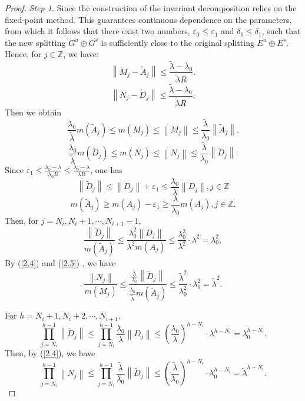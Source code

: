 \documentclass[12pt]{article}
\begin{document}
\begin{proof}{\em Step 1.}
	Since the construction of the invariant decomposition relies on the fixed‑point method. This guarantees continuous dependence on the parameters, from which it follows that there exist two numbers, $\varepsilon_0 \leqslant \varepsilon_1$ and $\delta _0 \leqslant \delta_1$, such that the new splitting $G^u \oplus G^s$ is sufficiently close to the original splitting $E^u \oplus E^s$. Hence, for $j \in \mathbb{Z}$, we have:
	$$
	\left\|M_{j}-\widetilde{A}_{j}\right\|\leqslant \frac{\widetilde{\lambda}-\lambda_{0}}{\widetilde{\lambda}R}.
	$$ 
	$$
	\left\|N_{j}-\widetilde{D}_{j}\right\|\leqslant \frac{\widetilde{\lambda}-\lambda_{0}}{\widetilde{\lambda}R}.
	$$ 
	Then we obtain
	\begin{equation}\label{2.4}\frac{\lambda_{0}}{\widetilde{\lambda}}m(\widetilde{A}_{j})\leqslant m(M_{j}) \leqslant \left\|M_{j}\right\|\leqslant \frac{\widetilde{\lambda}}{\lambda_{0}}\left\|\widetilde{A}_{j}\right\|.
	\end{equation}
	\begin{equation}\label{2.5}\frac{\lambda_{0}}{\widetilde{\lambda}}m(\widetilde{D}_{j})\leqslant m(N_{j}) \leqslant \left\|N_{j}\right\|\leqslant \frac{\widetilde{\lambda}}{\lambda_{0}}\left\|\widetilde{D}_{j}\right\|.
	\end{equation}
	Since $ \varepsilon_1\leqslant\frac{\lambda_{0}-\lambda}{\lambda_{0}R}\leqslant\frac{\lambda_{0}-\lambda}{\lambda R} $, one has 
	$$
	\left\|\widetilde{D}_{j}\right\|\leqslant \left\|D_{j}\right\|+\varepsilon_1\leqslant \frac{\lambda_{0}}{\lambda}\left\|D_{j}\right\|,j \in \mathbb Z
	$$
	$$
	m(\widetilde{A}_{j})\geqslant m(A_{j})-\varepsilon_1\geqslant\frac{\lambda}{\lambda_{0}}m(A_{j}),j \in \mathbb Z.
	$$ 
	Then, for $j=N_{i},N_{i}+1,\cdots,N_{i+1}-1$, 
	$$
	\frac{\left\|\widetilde{D}_{j}\right\|}{m(\widetilde{A}_{j})}\leqslant\frac{\lambda_{0}^{2}\left\|D_{j}\right\|}{\lambda^{2}m(A_{j})}\leqslant \frac{\lambda_{0}^{2}}{\lambda^{2}} \cdot \lambda^{2} =\lambda_{0}^{2},
	$$ 
	By (\ref{2.4}) and (\ref{2.5}) , we have 
	\begin{equation}\label{2.6}
		\frac{\left\|N_{j}\right\|}{m(M_{j})}\leqslant \frac{\frac{\widetilde{\lambda}}{\lambda_{0}}\left\|\widetilde{D}_{j}\right\|}{\frac{\lambda_{0}}{\widetilde{\lambda}}m(\widetilde{A}_{j})} \leqslant \frac{\widetilde{\lambda}^{2}}{\lambda_{0}^{2}}\cdot \lambda_{0}^{2}= \widetilde{\lambda}^{2}.
	\end{equation}
	
	For $h=N_{i}+1,N_{i}+2,\cdots,N_{i+1}$,
	$$
	\prod_{j=N_{i}}^{h-1} \left\|\widetilde{D}_{j}\right\|\leqslant \prod_{j=N_{i}}^{h-1} \frac{\lambda_{0}}{\lambda}\left\|D_{j}\right\| \leqslant (\frac{\lambda_{0}}{\lambda})^{h-N_{i}}\cdot\lambda^{h-N_{i}}=\lambda_{0}^{h-N_{i}}.
	$$ 
	Then, by (\ref{2.4}), we have 
	\begin{equation}\label{2.7}
		\prod_{j=N_{i}}^{h-1} \left\|N_{j}\right\|\leqslant \prod_{j=N_{i}}^{h-1} \frac{\widetilde{\lambda}}{\lambda_{0}}\left\|\widetilde{D}_{j}\right\| \leqslant (\frac{\widetilde{\lambda}}{\lambda_{0}})^{h-N_{i}}\cdot\lambda_{0}^{h-N_{i}}=\widetilde{\lambda}^{h-N_{i}}.
	\end{equation}
	

\end{proof}
\end{document}

